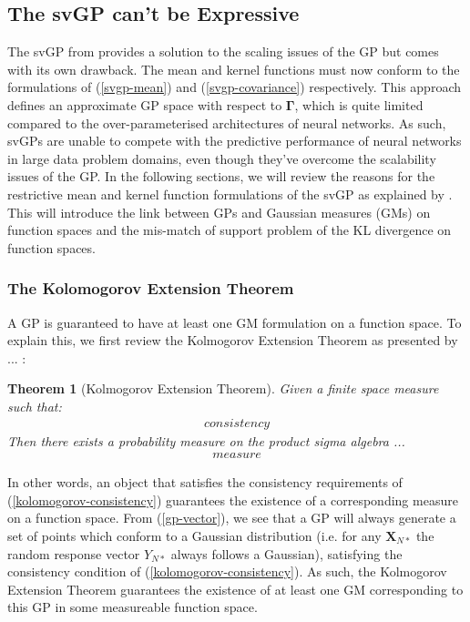 \documentclass{article}
\newtheorem{theorem}{Theorem}
\numberwithin{equation}{section}
\begin{document}
\subsection{The svGP can't be Expressive}\label{section:svgp-problems}
The svGP from \cite{titsias2009variational} provides a solution to the scaling issues of the GP but comes with its own drawback. The mean and kernel functions must now conform to the formulations of (\ref{svgp-mean}) and (\ref{svgp-covariance}) respectively. This approach defines an approximate GP space with respect to $\mathbf{\Gamma}$, which is quite limited compared to the over-parameterised architectures of neural networks. As such, svGPs are unable to compete with the predictive performance of neural networks in large data problem domains, even though they've overcome the scalability issues of the GP. In the following sections, we will review the reasons for the restrictive mean and kernel function formulations of the svGP as explained by \cite{matthews2017scalable}. This will introduce the link between GPs and Gaussian measures (GMs) on function spaces and the mis-match of support problem of the KL divergence on function spaces. 

\subsubsection{The Kolomogorov Extension Theorem}
A GP is guaranteed to have at least one GM formulation on a function space. To explain this, we first review the Kolmogorov Extension Theorem as presented by ... :
\begin{theorem}[Kolmogorov Extension Theorem]
\label{kolomogorov-extension-theorem}
Given a finite space measure such that:
\begin{align}
    consistency 
    \label{kolomogorov-consistency}
\end{align}
Then there exists a probability measure on the product sigma algebra ... 
\begin{align}
    measure
    \label{kolomogorov-measure}
\end{align}
\end{theorem}
In other words, an object that satisfies the consistency requirements of (\ref{kolomogorov-consistency}) guarantees the existence of a corresponding measure on a function space. From (\ref{gp-vector}), we see that a GP will always generate a set of points which conform to a Gaussian distribution (i.e. for any $\mathbf{X}_{N*}$ the random response vector $Y_{N*}$ always follows a Gaussian), satisfying the consistency condition of (\ref{kolomogorov-consistency}). As such, the Kolmogorov Extension Theorem guarantees the existence of at least one GM corresponding to this GP in some measureable function space. 
\end{document}
